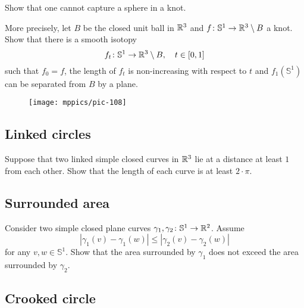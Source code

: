 \begin{pr}
Show that one cannot capture a sphere in a knot.

More precisely, let $B$ be the closed unit ball in $\mathbb{R}^3$
and $f\:\mathbb{S}^1\z\to \RR^3\setminus B$ a knot.
Show that there is a smooth isotopy 
$$f_t\colon\mathbb{S}^1\to \mathbb{R}^3\setminus B,\ \ \ t\in [0,1]$$ 
such that $f_0=f$,
the length of $f_t$ is non-increasing with respect to $t$
and $f_1(\mathbb{S}^1)$ can be separated from $B$ by a plane.
\end{pr}

{

\begin{wrapfigure}{r}{20 mm}
\vskip2mm
\centering
\texttt{[image: mppics/pic-108]}
\end{wrapfigure}

\subsection*{Linked circles}
\label{linked-circles}

\begin{pr}
Suppose that two linked simple closed curves in $\mathbb{R}^3$
lie at a distance at least $1$ from each other.
Show that the length of each curve is at least $2\cdot\pi$.
\end{pr}

}

\subsection*{Surrounded area}
\label{Surrounded area}

\begin{pr}
Consider two simple closed plane curves 
$\gamma_1,\gamma_2\colon\mathbb S^1\to\mathbb{R}^2$.
Assume 
\[|\gamma_1(v)-\gamma_1(w)|\le|\gamma_2(v)-\gamma_2(w)|\]
for any $v,w\in \mathbb S^1$.
Show that the area surrounded by $\gamma_1$ does not exceed the area surrounded by $\gamma_2$. 
\end{pr}



\subsection*{Crooked circle}

\label{Crooked circle}

